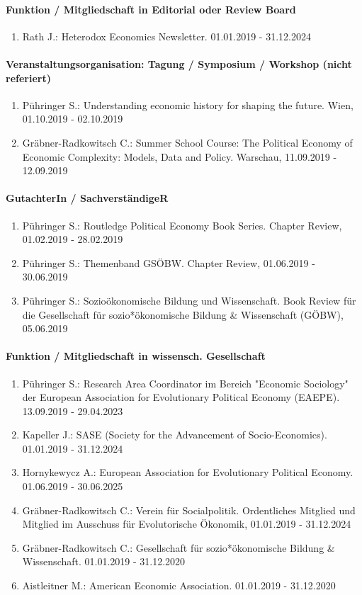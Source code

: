 \paragraph{Funktion / Mitgliedschaft in Editorial oder Review Board}
\begin{enumerate}[leftmargin=*, labelsep=0.5cm]
\item Rath J.: Heterodox Economics Newsletter. 01.01.2019 - 31.12.2024
\end{enumerate}
\paragraph{Veranstaltungsorganisation: Tagung / Symposium / Workshop (nicht referiert)}
\begin{enumerate}[leftmargin=*, labelsep=0.5cm]
\item Pühringer S.: Understanding economic history for shaping the future. Wien, 01.10.2019 - 02.10.2019
\item Gräbner-Radkowitsch C.: Summer School Course: The Political Economy of Economic Complexity: Models, Data and Policy. Warschau, 11.09.2019 - 12.09.2019
\end{enumerate}
\paragraph{GutachterIn / SachverständigeR}
\begin{enumerate}[leftmargin=*, labelsep=0.5cm]
\item Pühringer S.: Routledge Political Economy Book Series. Chapter Review, 01.02.2019 - 28.02.2019
\item Pühringer S.: Themenband GSÖBW. Chapter Review, 01.06.2019 - 30.06.2019
\item Pühringer S.: Sozioökonomische Bildung und Wissenschaft. Book Review für die Gesellschaft für sozio*ökonomische Bildung \& Wissenschaft (GÖBW), 05.06.2019
\end{enumerate}
\paragraph{Funktion / Mitgliedschaft in wissensch. Gesellschaft}
\begin{enumerate}[leftmargin=*, labelsep=0.5cm]
\item Pühringer S.: Research Area Coordinator im Bereich "Economic Sociology" der European Association for Evolutionary Political Economy (EAEPE). 13.09.2019 - 29.04.2023
\item Kapeller J.: SASE (Society for the Advancement of Socio-Economics). 01.01.2019 - 31.12.2024
\item Hornykewycz A.: European Association for Evolutionary Political Economy. 01.06.2019 - 30.06.2025
\item Gräbner-Radkowitsch C.: Verein für Socialpolitik. Ordentliches Mitglied und Mitglied im Ausschuss für Evolutorische Ökonomik, 01.01.2019 - 31.12.2024
\item Gräbner-Radkowitsch C.: Gesellschaft für sozio*ökonomische Bildung \& Wissenschaft. 01.01.2019 - 31.12.2020
\item Aistleitner M.: American Economic Association. 01.01.2019 - 31.12.2020
\end{enumerate}
